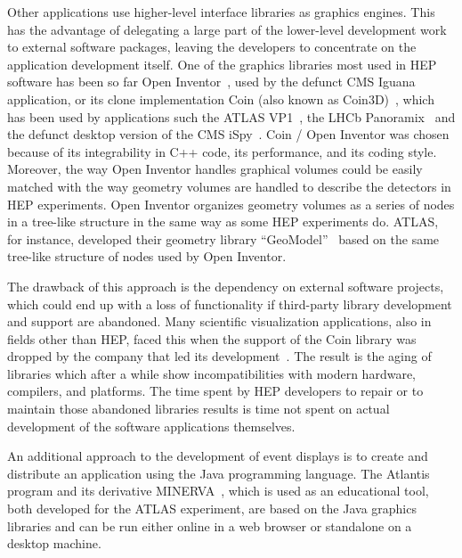 \documentclass[12pt,a4paper]{article}
\begin{document}

Other applications use higher-level interface libraries as graphics engines. This has the advantage of delegating
a large part of the lower-level development work to external software packages, leaving the developers to concentrate
on the application development itself. One of the graphics libraries most used in HEP software has been so far
Open Inventor~\cite{OpenInventor1993}, used by the defunct CMS Iguana~\cite{CMSIguanaPaperNIM,CMSIguana} application, or its clone implementation
Coin (also known as Coin3D)~\cite{Coin3D}, which has been used by applications such the ATLAS VP1~\cite{ATLASVP12010},
the LHCb Panoramix~\cite{LHCbPanoramix} and the defunct desktop version of the CMS iSpy~\cite{CMSISpy}. Coin / Open Inventor was
chosen because of its integrability in C++ code, its performance, and its coding style. Moreover, the way Open Inventor handles
graphical volumes could be easily matched with the way geometry volumes are handled to describe the detectors in HEP experiments.
Open Inventor organizes geometry volumes as a series of nodes in a tree-like structure in the same way as some
HEP experiments do. ATLAS, for instance, developed their geometry library “GeoModel”~\cite{ATLASGeoModel2004} based on
the same tree-like structure of nodes used by Open Inventor.

The drawback of this approach is the dependency on external software projects, which could end up with a loss of functionality if
third-party library development and support are abandoned. Many scientific visualization applications, also in fields other than
HEP, faced this when the support of the Coin library was dropped by the company that led its development~\cite{CoinEndOfLifeLetter}.
The result is the aging of libraries which after a while show incompatibilities with modern hardware, compilers, and platforms. The time
spent by HEP developers to repair or to maintain those abandoned libraries results is time not spent on actual development
of the software applications themselves.

An additional approach to the development of event displays is to create and distribute an application using the Java programming language. The Atlantis~\cite{ATLASAtlantis}
program and its derivative MINERVA~\cite{ATLASMinerva}, which is used as an educational tool, both developed for the ATLAS experiment, are based on the Java graphics libraries and can be run either online in a web browser or standalone on a desktop machine.
\end{document}
